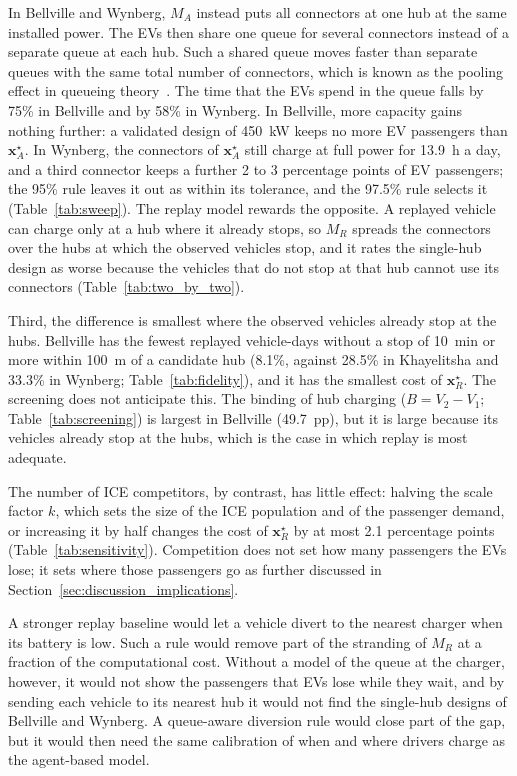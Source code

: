 \documentclass{elsarticle}
\newcommand{\MR}{\ensuremath{M_R}}
\newcommand{\MA}{\ensuremath{M_A}}
\newcommand{\xR}{\ensuremath{\mathbf{x}_R^{\star}}}
\newcommand{\xA}{\ensuremath{\mathbf{x}_A^{\star}}}
\begin{document}
In Bellville and Wynberg, \MA{} instead puts all connectors at one hub at the same installed power. The EVs then share one queue for several connectors instead of a separate queue at each hub. Such a shared queue moves faster than separate queues with the same total number of connectors, which is known as the pooling effect in queueing theory~\cite{smith1981_resource_sharing, mandelbaum1998_pooling_queueing_networks}. The time that the EVs spend in the queue falls by 75\% in Bellville and by 58\% in Wynberg. In Bellville, more capacity gains nothing further: a validated design of 450~kW keeps no more EV passengers than \xA. In Wynberg, the connectors of \xA{} still charge at full power for 13.9~h a day, and a third connector keeps a further 2 to 3 percentage points of EV passengers; the 95\% rule leaves it out as within its tolerance, and the 97.5\% rule selects it (Table~\ref{tab:sweep}). The replay model rewards the opposite. A replayed vehicle can charge only at a hub where it already stops, so \MR{} spreads the connectors over the hubs at which the observed vehicles stop, and it rates the single-hub design as worse because the vehicles that do not stop at that hub cannot use its connectors (Table~\ref{tab:two_by_two}).

Third, the difference is smallest where the observed vehicles already stop at the hubs. Bellville has the fewest replayed vehicle-days without a stop of 10~min or more within 100~m of a candidate hub (8.1\%, against 28.5\% in Khayelitsha and 33.3\% in Wynberg; Table~\ref{tab:fidelity}), and it has the smallest cost of \xR. The screening does not anticipate this. The binding of hub charging ($B = V_2 - V_1$; Table~\ref{tab:screening}) is largest in Bellville (49.7~pp), but it is large because its vehicles already stop at the hubs, which is the case in which replay is most adequate.

The number of ICE competitors, by contrast, has little effect: halving the scale factor $k$, which sets the size of the ICE population and of the passenger demand, or increasing it by half changes the cost of \xR{} by at most 2.1 percentage points (Table~\ref{tab:sensitivity}). Competition does not set how many passengers the EVs lose; it sets where those passengers go as further discussed in Section~\ref{sec:discussion_implications}.

A stronger replay baseline would let a vehicle divert to the nearest charger when its battery is low. Such a rule would remove part of the stranding of \MR{} at a fraction of the computational cost. Without a model of the queue at the charger, however, it would not show the passengers that EVs lose while they wait, and by sending each vehicle to its nearest hub it would not find the single-hub designs of Bellville and Wynberg. A queue-aware diversion rule would close part of the gap, but it would then need the same calibration of when and where drivers charge as the agent-based model.
\end{document}
